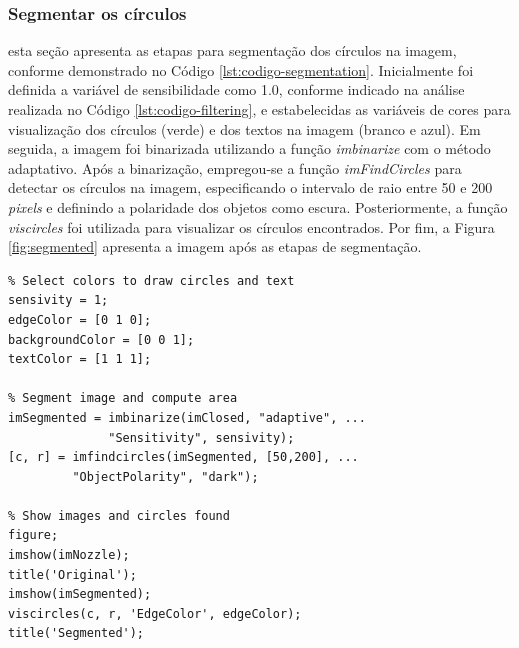 \documentclass[conference]{IEEEtran}
\begin{document}
\subsubsection{Segmentar os círculos} esta seção apresenta as etapas para segmentação dos círculos na imagem, conforme demonstrado no Código \ref{lst:codigo-segmentation}. Inicialmente foi definida a variável de sensibilidade como 1.0, conforme indicado na análise realizada no Código \ref{lst:codigo-filtering}, e estabelecidas as variáveis de cores para visualização dos círculos (verde) e dos textos na imagem (branco e azul). Em seguida, a imagem foi binarizada utilizando a função \textit{imbinarize} com o método adaptativo. Após a binarização, empregou-se a função \textit{imFindCircles} para detectar os círculos na imagem, especificando o intervalo de raio entre 50 e 200 \textit{pixels} e definindo a polaridade dos objetos como escura. Posteriormente, a função \textit{viscircles} foi utilizada para visualizar os círculos encontrados. Por fim, a Figura \ref{fig:segmented} apresenta a imagem após as etapas de segmentação.

\begin{lstlisting}[caption={Segmentação dos círculos escuros}, label={lst:codigo-segmentation}]
% Select sensivity to segmentation 
% Select colors to draw circles and text
sensivity = 1;
edgeColor = [0 1 0];
backgroundColor = [0 0 1];
textColor = [1 1 1];

% Segment image and compute area
imSegmented = imbinarize(imClosed, "adaptive", ...
		      "Sensitivity", sensivity); 
[c, r] = imfindcircles(imSegmented, [50,200], ...
  	  	 "ObjectPolarity", "dark");

% Show images and circles found
figure;
imshow(imNozzle);
title('Original');
imshow(imSegmented); 
viscircles(c, r, 'EdgeColor', edgeColor);
title('Segmented');
\end{lstlisting}
\end{document}

